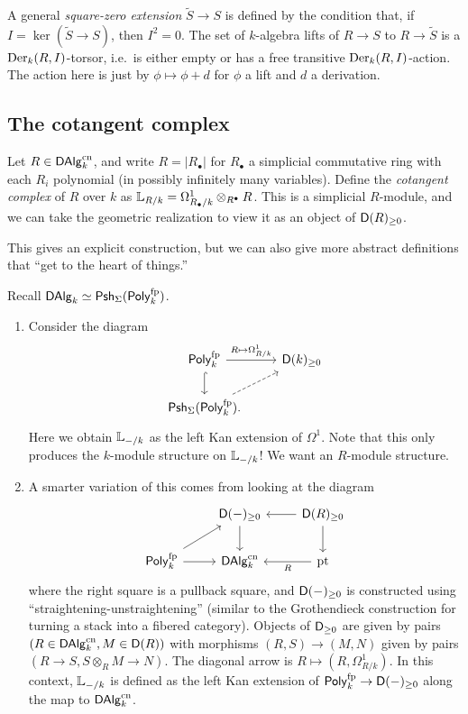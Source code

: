 \documentclass{amsart}
\begin{document}
A general \emph{square-zero extension} $\tilde{S} \to S$ is defined by the condition that, if $I = \ker(\tilde{S} \to S)$, then $I^2 = 0$.
The set of $k$-algebra lifts of $R \to S$ to $R \to \tilde{S}$ is a $\operatorname{Der}_k(R, I)$-torsor, i.e.\ is either empty or has a free transitive $\operatorname{Der}_k(R, I)$-action.
The action here is just by $\phi \mapsto \phi + d$ for $\phi$ a lift and $d$ a derivation.

\subsection{The cotangent complex}

\begin{dfn}
	Let $R \in \mathsf{DAlg}_k^{\mathrm{cn}}$, and write $R = |R_\bullet|$ for $R_\bullet$ a simplicial commutative ring with each $R_i$ polynomial (in possibly infinitely many variables).
	Define the \emph{cotangent complex} of $R$ over $k$ as $\mathbb{L}_{R/k} = \Omega^1_{R_\bullet/k} \otimes_{R^\bullet} R$.
	This is a simplicial $R$-module, and we can take the geometric realization to view it as an object of $\mathsf{D}(R)_{\geq 0}$.
\end{dfn}

This gives an explicit construction, but we can also give more abstract definitions that ``get to the heart of things.''

\begin{cons}
	Recall $\mathsf{DAlg}_k \simeq \mathsf{Psh}_\Sigma(\mathsf{Poly}^{\mathrm{fp}}_k)$.
	\begin{enumerate}
		\item Consider the diagram
			\[
				\begin{tikzcd}
					\Polyfp_k \rar["R \mapsto \Omega^1_{R/k}"] \dar[hook] & \Dsf(k)_{\geq 0} \\
					\Psh_\Sigma(\Polyfp_k). \ar[ur, dashed]
				\end{tikzcd}
			\]
			Here we obtain $\mathbb{L}_{-/k}$ as the left Kan extension of $\Omega^1$.
			Note that this only produces the $k$-module structure on $\mathbb{L}_{-/k}$!
			We want an $R$-module structure.
		\item A smarter variation of this comes from looking at the diagram
			\[
				\begin{tikzcd}
					& \Dsf(-)_{\geq 0} \dar & \Dsf(R)_{\geq 0} \lar \dar \\
					\Polyfp_k \ar[ur] \rar & \DAlg_k\cn & \pt \lar["R"]
				\end{tikzcd}
			\]
			where the right square is a pullback square, and $\mathsf{D}(-)_{\geq 0}$ is constructed using ``straightening-unstraightening'' (similar to the Grothendieck construction for turning a stack into a fibered category).
			Objects of $\mathsf{D}_{\geq 0}$ are given by pairs $(R \in \mathsf{DAlg}_k^{\mathrm{cn}}, M \in \mathsf{D}(R))$ with morphisms $(R, S) \to (M, N)$ given by pairs $(R \to S, S \otimes_R M \to N)$.
			The diagonal arrow is $R \mapsto (R, \Omega^1_{R/k})$.
			In this context, $\mathbb{L}_{-/k}$ is defined as the left Kan extension of $\mathsf{Poly}^{\mathrm{fp}}_k \to \mathsf{D}(-)_{\geq 0}$ along the map to $\mathsf{DAlg}_k^{\mathrm{cn}}$.
	\end{enumerate}
\end{cons}
\end{document}
